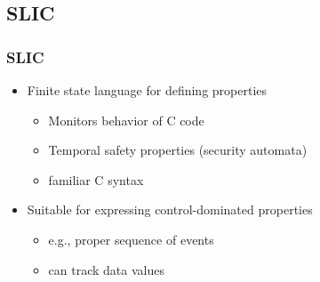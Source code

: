 \subsection{SLIC}

\begin{frame}
\frametitle{SLIC}

\begin{itemize}
\item {\color{ta3skyblue}Finite state language} for defining properties

\begin{itemize}
\item Monitors behavior of C code
\item Temporal safety properties (security automata)
\item familiar C syntax
\end{itemize}
\vfill

\item Suitable for expressing control-dominated properties
\begin{itemize}
\item e.g., proper sequence of events
\item can track data values
\end{itemize}

\end{itemize}

\end{frame}


